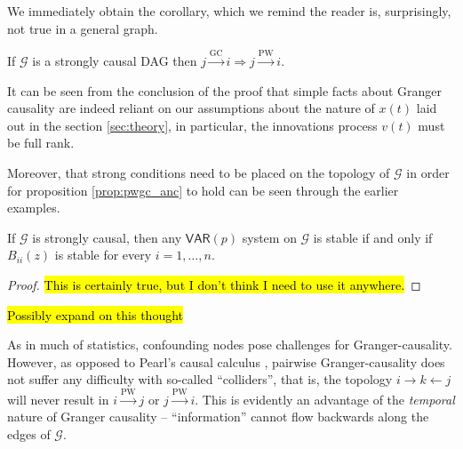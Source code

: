 \documentclass[12pt]{article}
\def\gc{\overset{\text{GC}}{\rightarrow}}  %
\def\pwgc{\overset{\text{PW}}{\rightarrow}}  %
\def\gcg{\mathcal{G}}  %
\def\VAR{\mathsf{VAR}}  %
\begin{document}
We immediately obtain the corollary, which we remind the reader is,
surprisingly, not true in a general graph.

\begin{corollary}
  \label{cor:gc_implies_pwgc}
  If $\gcg$ is a strongly causal DAG then $j \gc i \Rightarrow j \pwgc i$.
\end{corollary}

\begin{remark}
  It can be seen from the conclusion of the proof that simple facts
  about Granger causality are indeed reliant on our assumptions about
  the nature of $x(t)$ laid out in the section \ref{sec:theory}, in
  particular, the innovations process $v(t)$ must be full rank.
  
  Moreover, that strong conditions need to be placed on the topology
  of $\gcg$ in order for proposition \ref{prop:pwgc_anc} to hold can
  be seen through the earlier examples.
\end{remark}

\begin{lemma}
  If $\gcg$ is strongly causal, then any $\VAR(p)$ system on $\gcg$ is stable if and only if
  $B_{ii}(z)$ is stable for every $i = 1, \ldots, n$.
\end{lemma}
\begin{proof}
  \hl{This is certainly true, but I don't think I need to use it anywhere.}
\end{proof}


\begin{remark}
  \hl{Possibly expand on this thought}

  As in much of statistics, confounding nodes pose challenges for
  Granger-causality.  However, as opposed to Pearl's causal calculus
  \cite{pearl2000art}, pairwise Granger-causality does not suffer any
  difficulty with so-called ``colliders'', that is, the topology
  $i \rightarrow k \leftarrow j$ will never result in $i \pwgc j$ or
  $j \pwgc i$.  This is evidently an advantage of the \textit{temporal}
  nature of Granger causality -- ``information'' cannot flow backwards
  along the edges of $\gcg$.
\end{remark}
\end{document}
